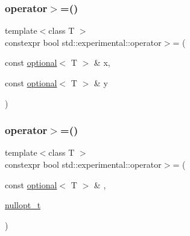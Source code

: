 \mbox{\label{namespacestd_1_1experimental_a2c2515ef0e94b6089f60aaf6757741c9}} 
\subsubsection{\texorpdfstring{operator$>$=()}{operator>=()}\hspace{0.1cm}{\footnotesize\ttfamily [1/9]}}
{\footnotesize\ttfamily template$<$class T $>$ \\
constexpr bool std\+::experimental\+::operator$>$= (\begin{DoxyParamCaption}\item[{const \hyperlink{classstd_1_1experimental_1_1optional}{optional}$<$ T $>$ \&}]{x,  }\item[{const \hyperlink{classstd_1_1experimental_1_1optional}{optional}$<$ T $>$ \&}]{y }\end{DoxyParamCaption})}

\mbox{\label{namespacestd_1_1experimental_a35cdc6a5b56b8db5690f4035242332a0}} 
\subsubsection{\texorpdfstring{operator$>$=()}{operator>=()}\hspace{0.1cm}{\footnotesize\ttfamily [2/9]}}
{\footnotesize\ttfamily template$<$class T $>$ \\
constexpr bool std\+::experimental\+::operator$>$= (\begin{DoxyParamCaption}\item[{const \hyperlink{classstd_1_1experimental_1_1optional}{optional}$<$ T $>$ \&}]{,  }\item[{\hyperlink{structstd_1_1experimental_1_1nullopt__t}{nullopt\+\_\+t}}]{ }\end{DoxyParamCaption})\hspace{0.3cm}{\ttfamily [noexcept]}}

\mbox{\label{namespacestd_1_1experimental_aec1ef0d119fb9270b05212cea79a0fe0}} 
